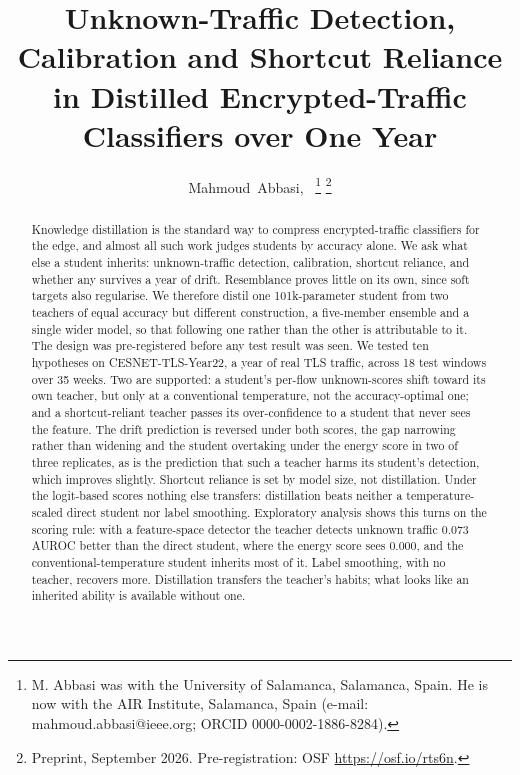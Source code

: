 \documentclass[journal]{IEEEtran}
\begin{document}
\title{Unknown-Traffic Detection, Calibration and Shortcut Reliance\\in Distilled Encrypted-Traffic Classifiers over One Year}

\author{Mahmoud~Abbasi,~%
\thanks{M. Abbasi was with the University of Salamanca, Salamanca, Spain. He is now with the AIR Institute, Salamanca, Spain (e-mail: mahmoud.abbasi@ieee.org; ORCID 0000-0002-1886-8284).}%
\thanks{Preprint, September 2026. Pre-registration: OSF \url{https://osf.io/rts6n}.}}


\maketitle

\begin{abstract}
Knowledge distillation is the standard way to compress encrypted-traffic classifiers for the edge, and almost all such work judges students by accuracy alone. We ask what else a student inherits: unknown-traffic detection, calibration, shortcut reliance, and whether any survives a year of drift. Resemblance proves little on its own, since soft targets also regularise. We therefore distil one 101k-parameter student from two teachers of equal accuracy but different construction, a five-member ensemble and a single wider model, so that following one rather than the other is attributable to it. The design was pre-registered before any test result was seen. We tested ten hypotheses on CESNET-TLS-Year22, a year of real TLS traffic, across 18 test windows over 35 weeks. Two are supported: a student's per-flow unknown-scores shift toward its own teacher, but only at a conventional temperature, not the accuracy-optimal one; and a shortcut-reliant teacher passes its over-confidence to a student that never sees the feature. The drift prediction is reversed under both scores, the gap narrowing rather than widening and the student overtaking under the energy score in two of three replicates, as is the prediction that such a teacher harms its student's detection, which improves slightly. Shortcut reliance is set by model size, not distillation. Under the logit-based scores nothing else transfers: distillation beats neither a temperature-scaled direct student nor label smoothing. Exploratory analysis shows this turns on the scoring rule: with a feature-space detector the teacher detects unknown traffic $0.073$ AUROC better than the direct student, where the energy score sees $0.000$, and the conventional-temperature student inherits most of it. Label smoothing, with no teacher, recovers more. Distillation transfers the teacher's habits; what looks like an inherited ability is available without one.
\end{abstract}
\end{document}
